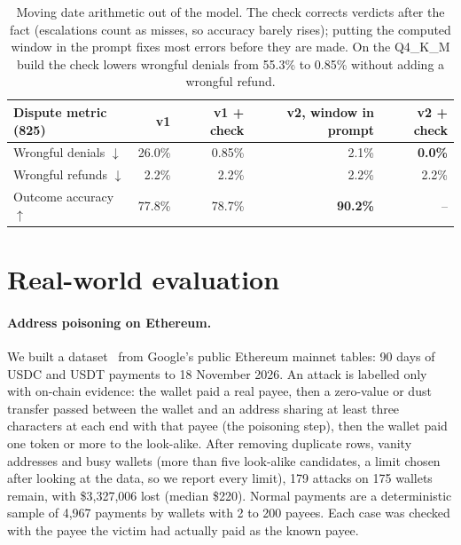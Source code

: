 \documentclass[11pt]{article}
\begin{document}
\begin{table}[t]
\centering
\small
\begin{tabular}{lrrrr}
\toprule
Dispute metric (825) & v1 & v1 + check & v2, window in prompt & v2 + check \\
\midrule
Wrongful denials $\downarrow$ & 26.0\% & 0.85\% & 2.1\% & \textbf{0.0\%} \\
Wrongful refunds $\downarrow$ & 2.2\% & 2.2\% & 2.2\% & 2.2\% \\
Outcome accuracy $\uparrow$ & 77.8\% & 78.7\% & \textbf{90.2\%} & -- \\
\bottomrule
\end{tabular}
\caption{Moving date arithmetic out of the model. The check corrects verdicts after the fact (escalations count as misses, so accuracy barely rises); putting the computed window in the prompt fixes most errors before they are made. On the Q4\_K\_M build the check lowers wrongful denials from 55.3\% to 0.85\% without adding a wrongful refund.}
\label{tab:window}
\end{table}

\section{Real-world evaluation}\label{sec:real}

\paragraph{Address poisoning on Ethereum.} We built a dataset~\cite{realworld} from Google's public Ethereum mainnet tables: 90 days of USDC and USDT payments to 18 November 2026. An attack is labelled only with on-chain evidence: the wallet paid a real payee, then a zero-value or dust transfer passed between the wallet and an address sharing at least three characters at each end with that payee (the poisoning step), then the wallet paid one token or more to the look-alike. After removing duplicate rows, vanity addresses and busy wallets (more than five look-alike candidates, a limit chosen after looking at the data, so we report every limit), 179 attacks on 175 wallets remain, with \$3,327,006 lost (median \$220). Normal payments are a deterministic sample of 4,967 payments by wallets with 2 to 200 payees. Each case was checked with the payee the victim had actually paid as the known payee.
\end{document}
